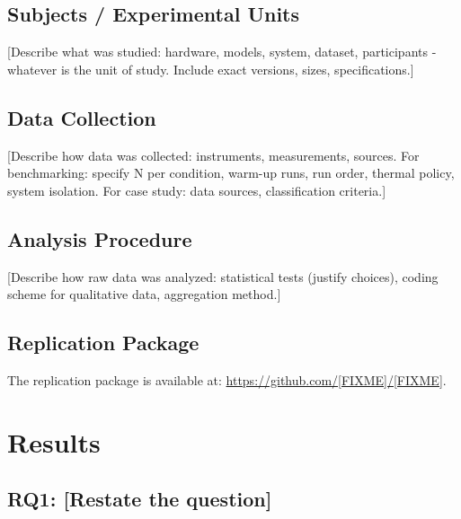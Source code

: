 \documentclass[11pt,a4paper]{article}
\newif\ifanonymized
\begin{document}
\subsection{Subjects / Experimental Units}

[Describe what was studied: hardware, models, system, dataset, participants - whatever is the unit of study. Include exact versions, sizes, specifications.]

\subsection{Data Collection}

[Describe how data was collected: instruments, measurements, sources. For benchmarking: specify N per condition, warm-up runs, run order, thermal policy, system isolation. For case study: data sources, classification criteria.]

\subsection{Analysis Procedure}

[Describe how raw data was analyzed: statistical tests (justify choices), coding scheme for qualitative data, aggregation method.]

\subsection{Replication Package}

\ifanonymized
  The replication package (data, scripts, and analysis notebooks) will be made available upon acceptance at [anonymous repository link].
\else
  The replication package is available at: \url{https://github.com/[FIXME]/[FIXME]}.
\fi


\section{Results}
\label{sec:results}

\subsection{RQ1: [Restate the question]}
\label{sec:rq1}
\end{document}
